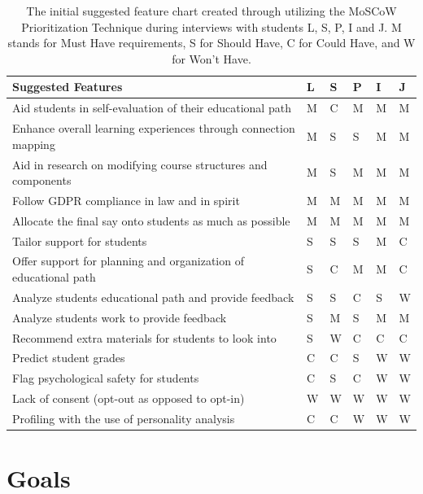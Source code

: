 \documentclass{l4proj}
\begin{document}
\begin{table}[h]
\caption{The initial suggested feature chart created through utilizing the MoSCoW Prioritization Technique during interviews with students L, S, P, I and J. M stands for Must Have requirements, S for Should Have, C for Could Have, and W for Won't Have.}
\label{tab:moscow}
\centering
{}
\begin{tabular}{@{}llllll@{}}
\textbf{Suggested Features} & \textbf{L} & \textbf{S} & \textbf{P} & \textbf{I} & \textbf{J} \\ \hline
Aid students in self-evaluation of their educational path & M & C & M & M & M \\
Enhance overall learning experiences through connection mapping & M & S & S & M & M \\
Aid in research on modifying course structures and components & M & S & M & M & M \\
Follow GDPR compliance in law and in spirit & M & M & M & M & M \\
Allocate the final say onto students as much as possible  & M & M & M & M & M \\
Tailor support for students & S & S & S & M & C \\
Offer support for planning and organization of educational path & S & C & M & M & C \\
Analyze students educational path and provide feedback & S & S & C & S & W \\
Analyze students work to provide feedback & S & M & S & M & M \\
Recommend extra materials for students to look into & S & W & C & C & C \\
Predict student grades & C & C & S & W & W \\
Flag psychological safety for students & C & S & C & W & W \\
Lack of consent (opt-out as opposed to opt-in) & W & W & W & W & W \\
Profiling with the use of personality analysis & C & C & W & W & W \\
\end{tabular}
\hspace{0.5cm}

\end{table}

\section{Goals}
\end{document}
